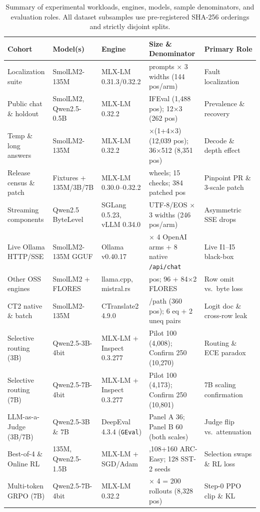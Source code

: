 \documentclass[11pt,letterpaper]{article}
\begin{document}
\begin{table}[t]
\centering
\setlength{\tabcolsep}{3.0pt}
\caption{Summary of experimental workloads, engines, models, sample denominators, and evaluation roles. All dataset subsamples use pre-registered SHA-256 orderings and strictly disjoint splits.}
\label{tab:workloads}
\footnotesize
\begin{tabular}{@{}>{\raggedright\arraybackslash}p{.19\linewidth}>{\raggedright\arraybackslash}p{.15\linewidth}>{\raggedright\arraybackslash}p{.16\linewidth}>{\raggedright\arraybackslash}p{.25\linewidth}>{\raggedright\arraybackslash}p{.17\linewidth}@{}}\toprule
Cohort & Model(s) & Engine & Size \& Denominator & Primary Role\\\midrule
Localization suite & SmolLM2-135M & MLX-LM 0.31.3/0.32.2 & 12 prompts $\times$ 3 widths (144 pos/arm) & Fault localization\\
Public chat \& holdout & SmolLM2, Qwen2.5-0.5B & MLX-LM 0.32.2 & 64 IFEval (1,488 pos); 12$\times$3 (262 pos) & Prevalence \& recovery\\
Temp \& long answers & SmolLM2-135M & MLX-LM 0.32.2 & 40$\times$(1+4$\times$3) (12,039 pos); 36$\times$512 (8,351 pos) & Decode \& depth effect\\
Release census \& patch & Fixtures + 135M/3B/7B & MLX-LM 0.30.0--0.32.2 & 12 wheels; 15 checks; 384 patched pos & Pinpoint PR \& 3-scale patch\\
Streaming components & Qwen2.5 ByteLevel & SGLang 0.5.23, vLLM 0.34.0 & 12 UTF-8/EOS $\times$ 3 widths (246 pos/arm) & Asymmetric SSE drops\\
Live Ollama HTTP/SSE & SmolLM2-135M GGUF & Ollama v0.40.17 & 24 $\times$ 4 OpenAI arms + 8 native \texttt{/api/chat} & Live \textsc{I1}--\textsc{I5} black-box\\
Other OSS engines & SmolLM2 + FLORES & llama.cpp, mistral.rs & 280 pos; 96 + 84$\times$2 FLORES & Row omit vs.\ byte loss\\
CT2 native \& batch & SmolLM2-135M & CTranslate2 4.9.0 & 30/path (360 pos); 6 eq + 2 uneq pairs & Logit doc \& cross-row leak\\
Selective routing (3B) & Qwen2.5-3B-4bit & MLX-LM + Inspect 0.3.277 & Pilot 100 (4,008); Confirm 250 (10,270) & Routing \& ECE paradox\\
Selective routing (7B) & Qwen2.5-7B-4bit & MLX-LM + Inspect 0.3.277 & Pilot 100 (4,173); Confirm 250 (10,801) & 7B scaling confirmation\\
LLM-as-a-Judge (3B/7B) & Qwen2.5-3B \& 7B & DeepEval 4.3.4 (\texttt{GEval}) & Panel A 36; Panel B 60 (both scales) & Judge flip vs.\ attenuation\\
Best-of-4 \& Online RL & 135M, Qwen2.5-1.5B & MLX-LM + SGD/Adam & 2,108+160 ARC-Easy; 128 SST-2 seeds & Selection swaps \& RL loss\\
Multi-token GRPO (7B) & Qwen2.5-7B-4bit & MLX-LM 0.32.2 & 50 $\times$ 4 = 200 rollouts (8,328 pos) & Step-0 PPO clip \& KL\\\bottomrule
\end{tabular}
\end{table}
\end{document}
